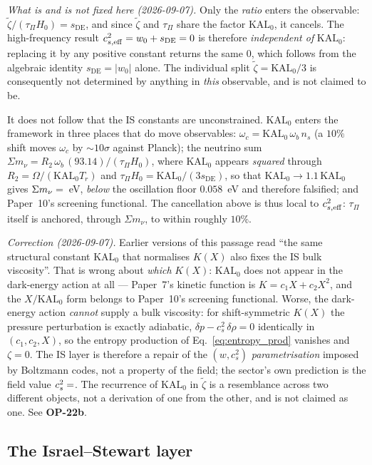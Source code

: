 \documentclass[12pt,a4paper]{article}
\newcommand{\KALz}{\mathrm{KAL}_0}
\newcommand{\wz}{w_0}
\newcommand{\sDE}{s_{\mathrm{DE}}}
\newcommand{\tauPi}{\tau_\Pi}
\newcommand{\ztilde}{\tilde{\zeta}}
\begin{document}
\emph{What is and is not fixed here (2026-09-07).} Only the \emph{ratio}
enters the observable: $\ztilde/(\tauPi H_0) = \sDE$, and since $\ztilde$ and
$\tauPi$ share the factor $\KALz$, it cancels. The high-frequency result
$c^2_{s,\rm eff} = \wz + \sDE = 0$ is therefore \emph{independent of}
$\KALz$: replacing it by any positive constant returns the same $0$, which
follows from the algebraic identity $\sDE = |\wz|$ alone. The individual split
$\ztilde = \KALz/3$ is consequently not determined by anything in \emph{this}
observable, and is not claimed to be.

It does not follow that the IS constants are unconstrained. $\KALz$ enters the
framework in three places that do move observables: $\omega_c =
\KALz\,\omega_b\,n_s$ (a $10\%$ shift moves $\omega_c$ by $\sim\!10\sigma$
against Planck); the neutrino sum $\Sigma m_\nu = R_2\,\omega_b\,(93.14)/(\tauPi
H_0)$, where $\KALz$ appears \emph{squared} through $R_2 = \Omega/(\KALz T_r)$
and $\tauPi H_0 = \KALz/(3\sDE)$, so that $\KALz \to 1.1\,\KALz$ gives
$\Sigma m_\nu = \val{smnu_kal11}$~eV, \emph{below} the oscillation floor $0.058$~eV and
therefore falsified; and Paper~10's screening functional. The cancellation
above is thus local to $c^2_{s,\rm eff}$: $\tauPi$ itself is anchored, through
$\Sigma m_\nu$, to within roughly $10\%$.

\emph{Correction (2026-09-07).} Earlier versions of this passage read
``the same structural constant $\KALz$ that normalises $K(X)$ also fixes the IS
bulk viscosity''. That is wrong about \emph{which} $K(X)$: $\KALz$ does not
appear in the dark-energy action at all --- Paper~7's kinetic function is
$K = c_1X + c_2X^2$, and the $X/\KALz$ form belongs to Paper~10's screening
functional. Worse, the dark-energy action \emph{cannot} supply a bulk
viscosity: for shift-symmetric $K(X)$ the pressure perturbation is exactly
adiabatic, $\delta p - c^2_s\,\delta\rho = 0$ identically in $(c_1,c_2,X)$, so
the entropy production of Eq.~\eqref{eq:entropy_prod} vanishes and $\zeta = 0$.
The IS layer is therefore a repair of the $(w,c^2_s)$ \emph{parametrisation}
imposed by Boltzmann codes, not a property of the field; the sector's own
prediction is the field value $c^2_s = \val{cs2_condensado_d6}$. The recurrence of $\KALz$ in
$\ztilde$ is a resemblance across two different objects, not a derivation of one
from the other, and is not claimed as one. See \textbf{OP-22b}.

\subsection{The Israel--Stewart layer}
\label{subsec:IS_intro}
\end{document}
